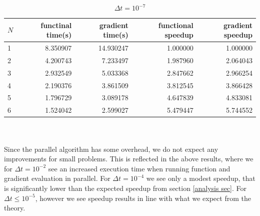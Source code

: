 \begin{table}[!h]
\centering
\caption{$\Delta t=10^{-7}$}
\label{speed_table_end}
\begin{tabular}{lrrrr}
\toprule
{}$N$ &  functinal time(s) &  gradient time(s) &  functional speedup &  gradient speedup \\
\midrule
1 &           8.350907 &         14.930247 &            1.000000 &          1.000000 \\
2 &           4.200743 &          7.233497 &            1.987960 &          2.064043 \\
3 &           2.932549 &          5.033368 &            2.847662 &          2.966254 \\
4 &           2.190376 &          3.861509 &            3.812545 &          3.866428 \\
5 &           1.796729 &          3.089178 &            4.647839 &          4.833081 \\
6 &           1.524042 &          2.599027 &            5.479447 &          5.744552 \\
\bottomrule
\end{tabular}
\end{table}
\\
\\
Since the parallel algorithm has some overhead, we do not expect any improvements for small problems. This is reflected in the above results, where we for $\Delta t = 10^{-2}$ see an increased execution time when running function and gradient evaluation in parallel. For $\Delta t = 10^{-4}$ we see only a modest speedup, that is significantly lower than the expected speedup from section \ref{analysis sec}. For $\Delta t \leq 10^{-5}$, however we see speedup results in line with what we expect from the theory.  
